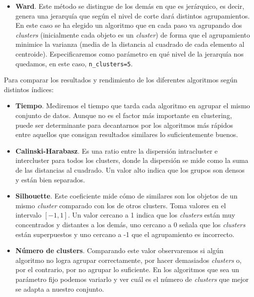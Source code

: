 \documentclass[a4paper, 20pt]{article}
\begin{document}
\begin{itemize}
\item \textbf{Ward}. Este método se distingue de los demás en que es jerárquico, es decir, genera una jerarquía que según el nivel de corte dará distintos agrupamientos. En este caso se ha elegido un algoritmo que en cada paso va agrupando dos \textit{clusters} (inicialmente cada objeto es un \textit{cluster}) de forma que el agrupamiento minimice la varianza (media de la distancia al cuadrado de cada elemento al centroide). Especificaremos como parámetro en qué nivel de la jerarquía nos quedamos, en este caso, \texttt{n\_clusters=5}.
\end{itemize}

Para comparar los resultados y rendimiento de los diferentes algoritmos según distintos índices:
\begin{itemize}
\item \textbf{Tiempo}. Mediremos el tiempo que tarda cada algoritmo en agrupar el mismo conjunto de datos. Aunque no es el factor más importante en clustering, puede ser determinante para decantarnos por los algoritmos más rápidos entre aquellos que consigan resultados similares lo suficientemente buenos.
\item \textbf{Calinski-Harabasz}. Es una ratio entre la dispersión intracluster e intercluster para todos los clusters, donde la dispersión se mide como la suma de las distancias al cuadrado. Un valor alto indica que los grupos son densos y están bien separados.
\item \textbf{Silhouette}. Este coeficiente mide cómo de similares son los objetos de un mismo \textit{cluster} comparado con los de otros clusters. Toma valores en el intervalo $[-1,1]$. Un valor cercano a 1 indica que los \textit{clusters} están muy concentrados y distantes a los demás, uno cercano a 0 señala que los \textit{clusters} están superpuestos y uno cercano a -1 que el agrupamiento es incorrecto.
\item \textbf{Número de clusters}. Comparando este valor observaremos si algún algoritmo no logra agrupar correctamente, por hacer demasiados \textit{clusters} o, por el contrario, por no agrupar lo suficiente. En los algoritmos que sea un parámetro fijo podemos variarlo y ver cuál es el número de \textit{clusters} que mejor se adapta a nuestro conjunto.
\end{itemize}
\end{document}
